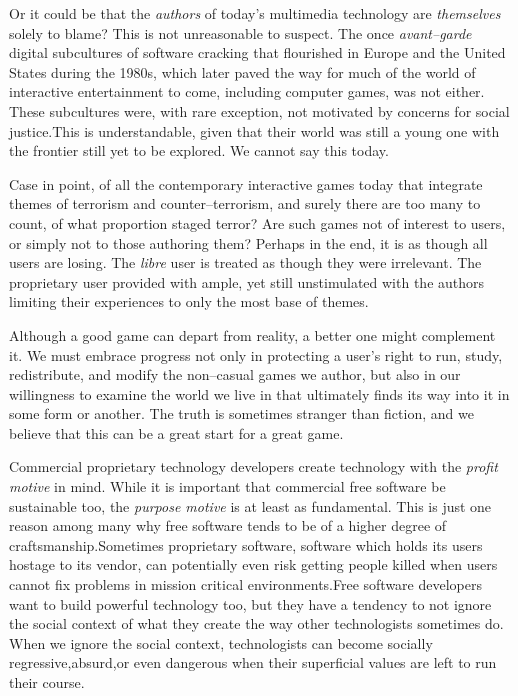 Or it could be that the {\it authors} of today's multimedia technology are {\it themselves} solely to blame? This is not unreasonable to suspect. The once {\it avant--garde} digital subcultures of software cracking that flourished in Europe and the United States during the 1980s, which later paved the way for much of the world of interactive entertainment to come, including computer games, was not either. These subcultures were, with rare exception, not motivated by concerns for social justice.\footnotecite[extras={, p.~18.}][wasiak2012] This is understandable, given that their world was still a young one with the frontier still yet to be explored. We cannot say this today.

Case in point, of all the contemporary interactive games today that integrate themes of terrorism and counter--terrorism, and surely there are too many to count, of what proportion staged terror? Are such games not of interest to users, or simply not to those authoring them? Perhaps in the end, it is as though all users are losing. The {\it libre} user is treated as though they were irrelevant. The proprietary user provided with ample, yet still unstimulated with the authors limiting their experiences to only the most base of themes.

Although a good game can depart from reality, a better one might complement it. We must embrace progress not only in protecting a user's right to run, study, redistribute, and modify the non--casual games we author, but also in our willingness to examine the world we live in that ultimately finds its way into it in some form or another. The truth is sometimes stranger than fiction, and we believe that this can be a great start for a great game.

Commercial proprietary technology developers create technology with the {\it profit motive} in mind. While it is important that commercial free software be sustainable too, the {\it purpose motive} is at least as fundamental. This is just one reason among many why free software tends to be of a higher degree of craftsmanship. Sometimes proprietary software, software which holds its users hostage to its vendor, can potentially even risk getting people killed when users cannot fix problems in mission critical environments. Free software developers want to build powerful technology too, but they have a tendency to not ignore the social context of what they create the way other technologists sometimes do. When we ignore the social context, technologists can become socially regressive, absurd, or even dangerous when their superficial values are left to run their course.\footnotecite[black2012]\footnotecite[brew2012]

